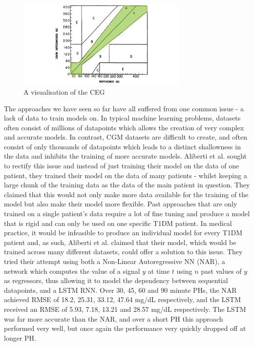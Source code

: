       \begin{figure}[H]
        \centering
        \includegraphics[width=0.75\textwidth]{images/cega.png} 
        \caption{
         A visualisation of the CEG \cite{cegaimage}
        }
      \end{figure}

      The approaches we have seen so far have all suffered from one common issue - a lack of data to train models on. In typical machine learning problems, datasets often consist of millions of datapoints which allows the creation of very complex and accurate models. In contrast, CGM datasets are difficult to create, and often consist of only thousands of datapoints which leads to a distinct shallowness in the data and inhibits the training of more accurate models. Aliberti et al. \cite{paper9} sought to rectify this issue and instead of just training their model on the data of one patient, they trained their model on the data of many patients - whilst keeping a large chunk of the training data as the data of the main patient in question. They claimed that this would not only make more data available for the training of the model but also make their model more flexible. Past approaches that are only trained on a single patient's data require a lot of fine tuning and produce a model that is rigid and can only be used on one specific T1DM patient. In medical practice, it would be infeasible to produce an individual model for every T1DM patient and, as such, Aliberti et al. \cite{paper9} claimed that their model, which would be trained across many different datasets, could offer a solution to this issue. They tried their attempt using both a Non-Linear Autoregressive NN (NAR), a network which computes the value of a signal $y$ at time $t$ using $n$ past values of $y$ as regressors, thus allowing it to model the dependency between sequential datapoints, and a LSTM RNN. Over 30, 45, 60 and 90 minute PHs, the NAR achieved RMSE of 18.2, 25.31, 33.12, 47.64 mg/dL respectively, and the LSTM received an RMSE of 5.93, 7.18, 13.21 and 28.57 mg/dL respectively. The LSTM was far more accurate than the NAR, and over a short PH this approach performed very well, but once again the performance very quickly dropped off at longer PH. 

